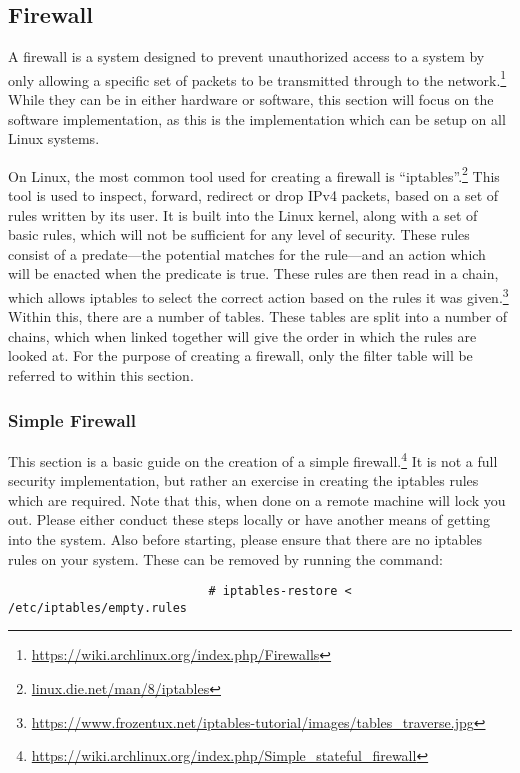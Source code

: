 				\subsection{Firewall}
					A firewall is a system designed to prevent unauthorized access to a system by only allowing a specific set of packets to be transmitted through to the network.\footnote{\url{https://wiki.archlinux.org/index.php/Firewalls}}
					While they can be in either hardware or software, this section will focus on the software implementation, as this is the implementation which can be setup on all Linux systems.

					On Linux, the most common tool used for creating a firewall is ``iptables''.\footnote{\url{linux.die.net/man/8/iptables}}
					This tool is used to inspect, forward, redirect or drop IPv4 packets, based on a set of rules written by its user.
					It is built into the Linux kernel, along with a set of basic rules, which will not be sufficient for any level of security.
					These rules consist of a predate---the potential matches for the rule---and an action which will be enacted when the predicate is true.
					These rules are then read in a chain, which allows iptables to select the correct action based on the rules it was given.\footnote{\url{https://www.frozentux.net/iptables-tutorial/images/tables\_traverse.jpg}}
					Within this, there are a number of tables.
					These tables are split into a number of chains, which when linked together will give the order in which the rules are looked at.
					For the purpose of creating a firewall, only the filter table will be referred to within this section.

					\subsubsection{Simple Firewall}
						This section is a basic guide on the creation of a simple firewall.\footnote{\url{https://wiki.archlinux.org/index.php/Simple\_stateful\_firewall}}
						It is not a full security implementation, but rather an exercise in creating the iptables rules which are required.
						Note that this, when done on a remote machine will lock you out.
						Please either conduct these steps locally or have another means of getting into the system.
						Also before starting, please ensure that there are no iptables rules on your system.
						These can be removed by running the command:
						\begin{verbatim}
							# iptables-restore < /etc/iptables/empty.rules
						\end{verbatim}

